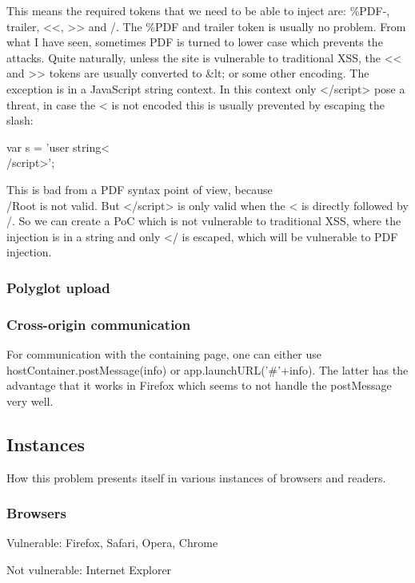 \documentclass[10pt, conference, compsocconf]{IEEEtran}
\begin{document}
This means the required tokens that we need to be able to 
inject are: \%PDF-, trailer, <<, >> and /.
The \%PDF and trailer token is usually no problem. From what 
I have seen, sometimes PDF is turned to lower case which 
prevents the attacks. Quite naturally, unless the site is 
vulnerable to traditional XSS, the << and >> tokens are usually 
converted to \&lt; or some other encoding. The exception is in 
a JavaScript string context. In this context only </script> 
pose a threat, in case the < is not encoded this is usually 
prevented by escaping the slash:

var s = 'user string<\\/script>';

This is bad from a PDF syntax point of view, because \\/Root is 
not valid. But </script> is only valid when the < is directly 
followed by /. So we can create a PoC which is not vulnerable to 
traditional XSS, where the injection is  in a string and only </ 
is escaped, which will be vulnerable to PDF injection.


\subsubsection{Polyglot upload}



\subsubsection{Cross-origin communication}

For communication with the containing page, one can either use 
hostContainer.postMessage(info) or app.launchURL('\#'+info). The 
latter has the advantage that it works in Firefox which seems 
to not handle the postMessage very well.


\subsection{Instances}

How this problem presents itself in various instances of browsers and readers.


\subsubsection{Browsers}

Vulnerable: Firefox, Safari, Opera, Chrome

Not vulnerable: Internet Explorer
\end{document}
